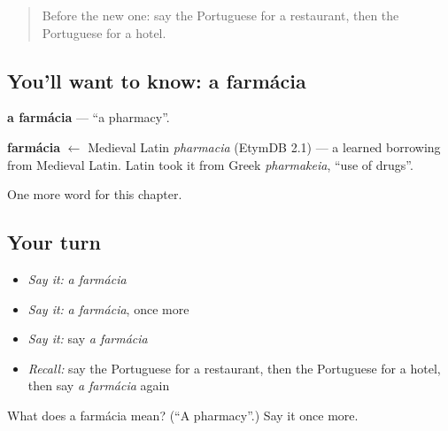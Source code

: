 \begin{quote}
Before the new one: say the Portuguese for a restaurant, then the Portuguese for a hotel.
\end{quote}

\subsection*{You'll want to know: a farmácia}
\textbf{a farmácia} — \textquotedblleft{}a pharmacy\textquotedblright{}.

\begin{cousinweb}
\textbf{farmácia} $\leftarrow$ Medieval Latin \emph{pharmacia} (EtymDB 2.1) — a learned borrowing from Medieval Latin. Latin took it from Greek \emph{pharmakeia}, \textquotedblleft{}use of drugs\textquotedblright{}.
\end{cousinweb}

\begin{grammarlens}[title={What you've built}]
One more word for this chapter.
\end{grammarlens}

\subsection*{Your turn}
\begin{itemize}
\raggedright
  \item \emph{Say it:} \emph{a farmácia}
  \item \emph{Say it:} \emph{a farmácia}, once more
  \item \emph{Say it:} say \emph{a farmácia}
  \item \emph{Recall:} say the Portuguese for a restaurant, then the Portuguese for a hotel, then say \emph{a farmácia} again
\end{itemize}

\begin{tcolorbox}[breakable,colback=teal!4,colframe=teal!35!black,title={Before you move on}]
What does a farmácia mean? (\textquotedblleft{}A pharmacy\textquotedblright{}.) Say it once more.
\end{tcolorbox}
